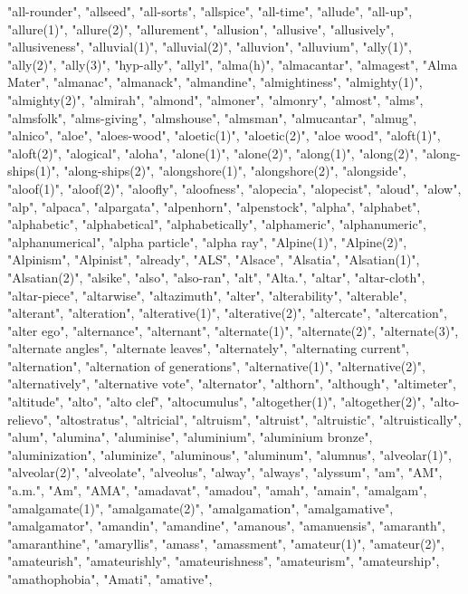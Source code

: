 "all-rounder",
"allseed",
"all-sorts",
"allspice",
"all-time",
"allude",
"all-up",
"allure(1)",
"allure(2)",
"allurement",
"allusion",
"allusive",
"allusively",
"allusiveness",
"alluvial(1)",
"alluvial(2)",
"alluvion",
"alluvium",
"ally(1)",
"ally(2)",
"ally(3)",
"hyp-ally",
"allyl",
"alma(h)",
"almacantar",
"almagest",
"Alma Mater",
"almanac",
"almanack",
"almandine",
"almightiness",
"almighty(1)",
"almighty(2)",
"almirah",
"almond",
"almoner",
"almonry",
"almost",
"alms",
"almsfolk",
"alms-giving",
"almshouse",
"almsman",
"almucantar",
"almug",
"alnico",
"aloe",
"aloes-wood",
"aloetic(1)",
"aloetic(2)",
"aloe wood",
"aloft(1)",
"aloft(2)",
"alogical",
"aloha",
"alone(1)",
"alone(2)",
"along(1)",
"along(2)",
"along-ships(1)",
"along-ships(2)",
"alongshore(1)",
"alongshore(2)",
"alongside",
"aloof(1)",
"aloof(2)",
"aloofly",
"aloofness",
"alopecia",
"alopecist",
"aloud",
"alow",
"alp",
"alpaca",
"alpargata",
"alpenhorn",
"alpenstock",
"alpha",
"alphabet",
"alphabetic",
"alphabetical",
"alphabetically",
"alphameric",
"alphanumeric",
"alphanumerical",
"alpha particle",
"alpha ray",
"Alpine(1)",
"Alpine(2)",
"Alpinism",
"Alpinist",
"already",
"ALS",
"Alsace",
"Alsatia",
"Alsatian(1)",
"Alsatian(2)",
"alsike",
"also",
"also-ran",
"alt",
"Alta.",
"altar",
"altar-cloth",
"altar-piece",
"altarwise",
"altazimuth",
"alter",
"alterability",
"alterable",
"alterant",
"alteration",
"alterative(1)",
"alterative(2)",
"altercate",
"altercation",
"alter ego",
"alternance",
"alternant",
"alternate(1)",
"alternate(2)",
"alternate(3)",
"alternate angles",
"alternate leaves",
"alternately",
"alternating current",
"alternation",
"alternation of generations",
"alternative(1)",
"alternative(2)",
"alternatively",
"alternative vote",
"alternator",
"althorn",
"although",
"altimeter",
"altitude",
"alto",
"alto clef",
"altocumulus",
"altogether(1)",
"altogether(2)",
"alto-relievo",
"altostratus",
"altricial",
"altruism",
"altruist",
"altruistic",
"altruistically",
"alum",
"alumina",
"aluminise",
"aluminium",
"aluminium bronze",
"aluminization",
"aluminize",
"aluminous",
"aluminum",
"alumnus",
"alveolar(1)",
"alveolar(2)",
"alveolate",
"alveolus",
"alway",
"always",
"alyssum",
"am",
"AM",
"a.m.",
"Am",
"AMA",
"amadavat",
"amadou",
"amah",
"amain",
"amalgam",
"amalgamate(1)",
"amalgamate(2)",
"amalgamation",
"amalgamative",
"amalgamator",
"amandin",
"amandine",
"amanous",
"amanuensis",
"amaranth",
"amaranthine",
"amaryllis",
"amass",
"amassment",
"amateur(1)",
"amateur(2)",
"amateurish",
"amateurishly",
"amateurishness",
"amateurism",
"amateurship",
"amathophobia",
"Amati",
"amative",
